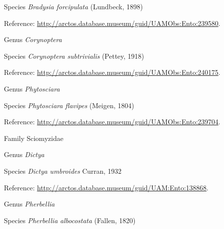 \documentclass[9pt, article]{memoir}
\begin{document}
\begin{multicols}{2}
\vspace{6pt}\noindent\hspace{36pt}Species \textit{Bradysia forcipulata} (Lundbeck, 1898)


\vspace{6pt}Reference: 
\url{http://arctos.database.museum/guid/UAMObs:Ento:239580}.

\vspace{6pt}\noindent\hspace{30pt}Genus \textit{Corynoptera}


\vspace{6pt}\noindent\hspace{36pt}Species \textit{Corynoptera subtrivialis} (Pettey, 1918)


\vspace{6pt}Reference: 
\url{http://arctos.database.museum/guid/UAMObs:Ento:240175}.

\vspace{6pt}\noindent\hspace{30pt}Genus \textit{Phytosciara}


\vspace{6pt}\noindent\hspace{36pt}Species \textit{Phytosciara flavipes} (Meigen, 1804)


\vspace{6pt}Reference: 
\url{http://arctos.database.museum/guid/UAMObs:Ento:239704}.

\vspace{6pt}\noindent\hspace{24pt}Family Sciomyzidae


\vspace{6pt}\noindent\hspace{30pt}Genus \textit{Dictya}


\vspace{6pt}\noindent\hspace{36pt}Species \textit{Dictya umbroides} Curran, 1932


\vspace{6pt}Reference: 
\url{http://arctos.database.museum/guid/UAM:Ento:138868}.

\vspace{6pt}\noindent\hspace{30pt}Genus \textit{Pherbellia}


\vspace{6pt}\noindent\hspace{36pt}Species \textit{Pherbellia albocostata} (Fallen, 1820)



\end{multicols}
\end{document}
